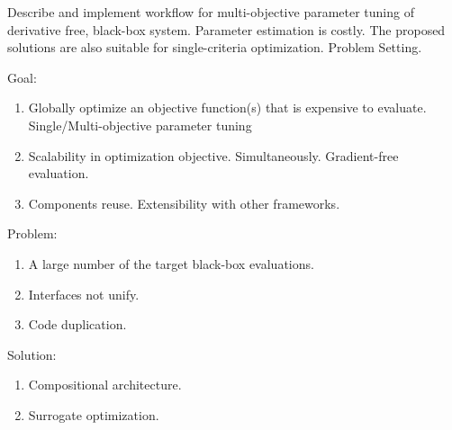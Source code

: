         Describe and implement workflow for multi-objective parameter tuning of derivative free, black-box system. Parameter estimation is costly.
        The proposed solutions are also suitable for single-criteria optimization. Problem Setting.

        Goal:
        \begin{enumerate}
            \item Globally optimize an objective function(s) that is expensive to evaluate. Single/Multi-objective parameter tuning
            \item Scalability in optimization objective. Simultaneously. Gradient-free evaluation.
            \item Components reuse. Extensibility with other frameworks.
        \end{enumerate}

        Problem:
        \begin{enumerate}
            \item A large number of the target black-box evaluations.
            \item Interfaces not unify.
            \item Code duplication.
        \end{enumerate}

        Solution:
        \begin{enumerate}
            \item Compositional architecture.
            \item Surrogate optimization.
        \end{enumerate}
